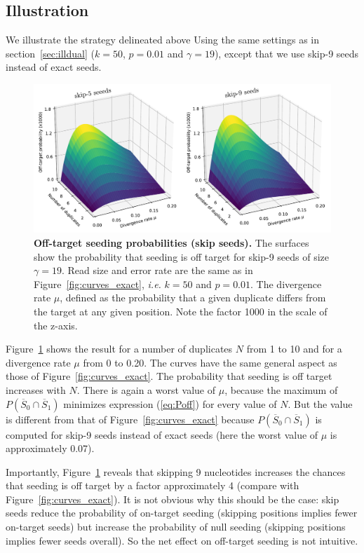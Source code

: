 \documentclass{article}
\begin{document}
\subsection{Illustration}
\label{sec:illskipdual}

We illustrate the strategy delineated above Using the same settings as in
section~\ref{sec:illdual} ($k=50$, $p=0.01$ and $\gamma=19$), except that
we use skip-9 seeds instead of exact seeds.

\begin{figure}[h]
\centering
\includegraphics[scale=0.47]{curves_skip.pdf}
\caption{\textbf{Off-target seeding probabilities (skip seeds).}
The surfaces show the probability that seeding is off target for skip-9
seeds of size $\gamma=19$. Read size and error rate are the same as in
Figure~\ref{fig:curves_exact}, \textit{i.e.} $k=50$ and $p=0.01$. The
divergence rate $\mu$, defined as the probability that a given duplicate
differs from the target at any given position. Note the factor 1000 in
the scale of the z-axis.}
\label{fig:curves_skip}
\end{figure}

Figure~\ref{fig:curves_skip} shows the result for a number of duplicates $N$
from 1 to 10 and for a divergence rate $\mu$ from 0 to 0.20. The curves
have the same general aspect as those of Figure~\ref{fig:curves_exact}. The
probability that seeding is off target increases with $N$. There is again
a  worst value of $\mu$, because the maximum of $P(\overline{S}_0 \cap
\overline{S}_1)$ minimizes expression (\ref{eq:Poff}) for every value of
$N$. But the value is different from that of Figure~\ref{fig:curves_exact}
because $P(\overline{S}_0 \cap \overline{S}_1)$ is computed for skip-9
seeds instead of exact seeds (here the worst value of $\mu$ is
approximately 0.07).

Importantly, Figure~\ref{fig:curves_skip} reveals that skipping 9
nucleotides increases the chances that seeding is off target by a factor
approximately 4 (compare with Figure~\ref{fig:curves_exact}). It is not
obvious why this should be the case: skip seeds reduce the probability of
on-target seeding (skipping positions implies fewer on-target seeds) but
increase the probability of null seeding (skipping positions implies fewer
seeds overall). So the net effect on off-target seeding is not intuitive.
\end{document}
